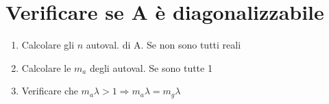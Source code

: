 \section{Verificare se A è diagonalizzabile}
\begin{enumerate}[noitemsep]
	\item Calcolare gli $n$ autoval. di A. Se non sono tutti reali \Frowny{}
	\item Calcolare le $m_a$ degli autoval. Se sono tutte 1 \Smiley{}
	\item Verificare che $m_a \lambda > 1 \Rightarrow m_a \lambda = m_g \lambda$ \Smiley{}
\end{enumerate}
